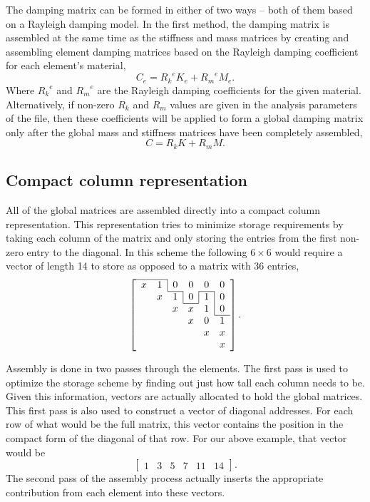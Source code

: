 The damping matrix can be formed in either of two ways -- both of them
based on a Rayleigh damping model.   In the first method, the damping
matrix is assembled at the same time as the stiffness and mass matrices
by creating and assembling element damping matrices based on the 
Rayleigh damping coefficient for each element's material, 
\begin{equation}
{C_{e}} = {{R_{k}}^{e} K_{e} + {R_{m}}^{e} M_{e}}.
\end{equation}
Where ${R_k}^e$ and ${R_m}^e$ are the Rayleigh damping coefficients for 
the given material.  Alternatively, if non-zero $R_k$ and $R_m$ values are
given in the analysis parameters of the \felt{} file, then these coefficients
will be applied to form a global damping matrix only after the global
mass and stiffness matrices have been completely assembled,
\begin{equation}
{C} = {R_{k} K + R_{m} M}.
\end{equation}

\subsection{Compact column representation}
All of the global matrices are assembled directly into a compact 
column representation.  This representation tries to minimize storage
requirements by taking each column of the matrix and only storing the
entries from the first non-zero entry to the diagonal.  In this scheme
the following $6\times6$ would require a vector of length 14 to store
as opposed to a matrix with 36 entries,
$$
\def\tempa{\multicolumn{1}{c|}{0}}
\def\tempb{\multicolumn{1}{c|}{1}}
\left[
\begin{array}{cccccc}
\cline{1-2} 
x & \tempb & 0 & 0 & 0 & 0 \\ \cline{3-3} \cline{5-5}
  & x & \tempb & \tempa & \tempb & 0 \\ \cline{4-4}
  &   & x & x & \tempb & 0 \\ \cline{6-6}
  &   &   & x & 0 & 1 \\
  &   &   &   & x & x \\
  &   &   &   &   & x 
\end{array}
\right].
$$

Assembly is done in two passes through
the elements.  The first pass is used to optimize the storage scheme
by finding out just how tall each column needs to be. Given this information,
vectors are actually allocated to hold the global matrices.  This
first pass is also used to construct a vector of diagonal addresses. For each
row of what would be the full matrix, this vector contains the position
in the compact form of the diagonal of that row.  For our above example,
that vector would be 
$$
\left[ 
\begin{array}{cccccc}
1 & 3 & 5 & 7 & 11 & 14 
\end{array}
\right].
$$
The second pass of the assembly process actually inserts the appropriate 
contribution from each element into these vectors.  

